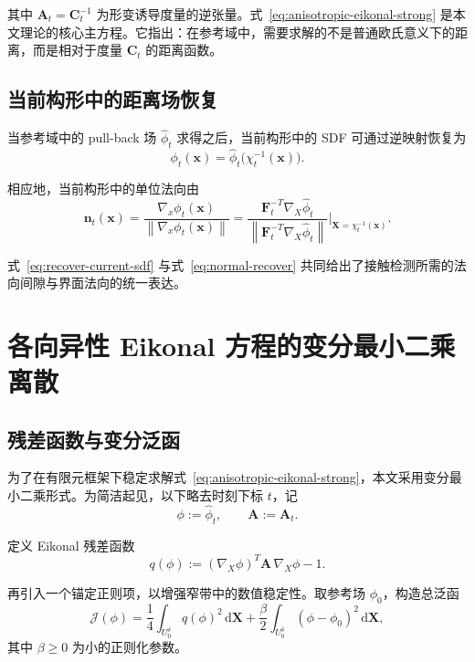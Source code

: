 \documentclass[12pt,a4paper]{ctexart}
\numberwithin{equation}{section}
\newcommand{\cJ}{\mathcal{J}}
\newcommand{\bA}{\bm{A}}
\newcommand{\bC}{\bm{C}}
\newcommand{\bF}{\bm{F}}
\newcommand{\bn}{\bm{n}}
\newcommand{\bx}{\bm{x}}
\newcommand{\bX}{\bm{X}}
\newcommand{\gradX}{\nabla_{\!X}}
\newcommand{\gradx}{\nabla_{\!x}}
\newcommand{\dd}{\,\mathrm{d}}
\newcommand{\norm}[1]{\left\lVert #1 \right\rVert}
\begin{document}
其中 $\bA_t=\bC_t^{-1}$ 为形变诱导度量的逆张量。式~\eqref{eq:anisotropic-eikonal-strong} 是本文理论的核心主方程。它指出：在参考域中，需要求解的不是普通欧氏意义下的距离，而是相对于度量 $\bC_t$ 的距离函数。

\subsection{当前构形中的距离场恢复}

当参考域中的 pull-back 场 $\widehat{\phi}_t$ 求得之后，当前构形中的 SDF 可通过逆映射恢复为
\begin{equation}
\phi_t(\bx)=\widehat{\phi}_t\bigl(\chi_t^{-1}(\bx)\bigr).
\label{eq:recover-current-sdf}
\end{equation}

相应地，当前构形中的单位法向由
\begin{equation}
\bn_t(\bx)=
\frac{\gradx \phi_t(\bx)}{\norm{\gradx \phi_t(\bx)}}
=
\frac{\bF_t^{-T}\gradX \widehat{\phi}_t}{\norm{\bF_t^{-T}\gradX \widehat{\phi}_t}}
\Bigg|_{\bX=\chi_t^{-1}(\bx)}.
\label{eq:normal-recover}
\end{equation}

式~\eqref{eq:recover-current-sdf} 与式~\eqref{eq:normal-recover} 共同给出了接触检测所需的法向间隙与界面法向的统一表达。

\section{各向异性 Eikonal 方程的变分最小二乘离散}\label{sec:fem-sdf}

\subsection{残差函数与变分泛函}

为了在有限元框架下稳定求解式~\eqref{eq:anisotropic-eikonal-strong}，本文采用变分最小二乘形式。为简洁起见，以下略去时刻下标 $t$，记
\begin{equation}
\phi := \widehat{\phi}_t,
\qquad
\bA := \bA_t.
\end{equation}

定义 Eikonal 残差函数
\begin{equation}
q(\phi) := (\gradX \phi)^T \bA \, \gradX \phi - 1.
\label{eq:q-def}
\end{equation}

再引入一个锚定正则项，以增强窄带中的数值稳定性。取参考场 $\phi_0$，构造总泛函
\begin{equation}
\cJ(\phi)
=
\frac{1}{4}\int_{U_0^\delta} q(\phi)^2\dd\bX
+
\frac{\beta}{2}\int_{U_0^\delta}(\phi-\phi_0)^2\dd\bX,
\label{eq:functional-J}
\end{equation}
其中 $\beta\ge 0$ 为小的正则化参数。
\end{document}

